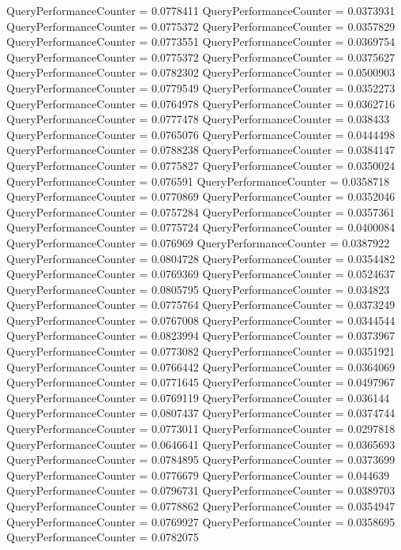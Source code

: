 \documentclass[9pt]{article}
\theoremstyle{plain}
\theoremstyle{definition}
\theoremstyle{remark}
\numberwithin{equation}{section}
\begin{document}
QueryPerformanceCounter  =  0.0778411
QueryPerformanceCounter  =  0.0373931
QueryPerformanceCounter  =  0.0775372
QueryPerformanceCounter  =  0.0357829
QueryPerformanceCounter  =  0.0773551
QueryPerformanceCounter  =  0.0369754
QueryPerformanceCounter  =  0.0775372
QueryPerformanceCounter  =  0.0375627
QueryPerformanceCounter  =  0.0782302
QueryPerformanceCounter  =  0.0500903
QueryPerformanceCounter  =  0.0779549
QueryPerformanceCounter  =  0.0352273
QueryPerformanceCounter  =  0.0764978
QueryPerformanceCounter  =  0.0362716
QueryPerformanceCounter  =  0.0777478
QueryPerformanceCounter  =  0.038433
QueryPerformanceCounter  =  0.0765076
QueryPerformanceCounter  =  0.0444498
QueryPerformanceCounter  =  0.0788238
QueryPerformanceCounter  =  0.0384147
QueryPerformanceCounter  =  0.0775827
QueryPerformanceCounter  =  0.0350024
QueryPerformanceCounter  =  0.076591
QueryPerformanceCounter  =  0.0358718
QueryPerformanceCounter  =  0.0770869
QueryPerformanceCounter  =  0.0352046
QueryPerformanceCounter  =  0.0757284
QueryPerformanceCounter  =  0.0357361
QueryPerformanceCounter  =  0.0775724
QueryPerformanceCounter  =  0.0400084
QueryPerformanceCounter  =  0.076969
QueryPerformanceCounter  =  0.0387922
QueryPerformanceCounter  =  0.0804728
QueryPerformanceCounter  =  0.0354482
QueryPerformanceCounter  =  0.0769369
QueryPerformanceCounter  =  0.0524637
QueryPerformanceCounter  =  0.0805795
QueryPerformanceCounter  =  0.034823
QueryPerformanceCounter  =  0.0775764
QueryPerformanceCounter  =  0.0373249
QueryPerformanceCounter  =  0.0767008
QueryPerformanceCounter  =  0.0344544
QueryPerformanceCounter  =  0.0823994
QueryPerformanceCounter  =  0.0373967
QueryPerformanceCounter  =  0.0773082
QueryPerformanceCounter  =  0.0351921
QueryPerformanceCounter  =  0.0766442
QueryPerformanceCounter  =  0.0364069
QueryPerformanceCounter  =  0.0771645
QueryPerformanceCounter  =  0.0497967
QueryPerformanceCounter  =  0.0769119
QueryPerformanceCounter  =  0.036144
QueryPerformanceCounter  =  0.0807437
QueryPerformanceCounter  =  0.0374744
QueryPerformanceCounter  =  0.0773011
QueryPerformanceCounter  =  0.0297818
QueryPerformanceCounter  =  0.0646641
QueryPerformanceCounter  =  0.0365693
QueryPerformanceCounter  =  0.0784895
QueryPerformanceCounter  =  0.0373699
QueryPerformanceCounter  =  0.0776679
QueryPerformanceCounter  =  0.044639
QueryPerformanceCounter  =  0.0796731
QueryPerformanceCounter  =  0.0389703
QueryPerformanceCounter  =  0.0778862
QueryPerformanceCounter  =  0.0354947
QueryPerformanceCounter  =  0.0769927
QueryPerformanceCounter  =  0.0358695
QueryPerformanceCounter  =  0.0782075
\end{document}
